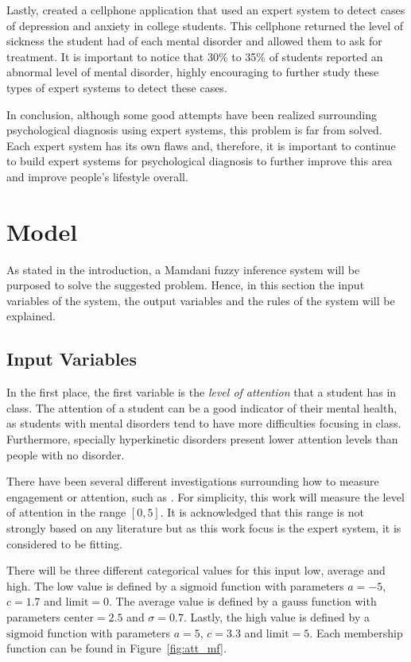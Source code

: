 \documentclass[conference]{IEEEtran}
\theoremstyle{definition}
\theoremstyle{remark}
\theoremstyle{remark}
\begin{document}
Lastly, \textcite{jabeen2018} created a cellphone application that used an
expert system to detect cases of depression and anxiety in college students.
This cellphone returned the level of sickness the student had of each mental
disorder and allowed them to ask for treatment. It is important to notice that
30\% to 35\% of students reported an abnormal level of mental disorder, highly
encouraging to further study these types of expert systems to detect these
cases.

In conclusion, although some good attempts have been realized surrounding
psychological diagnosis using expert systems, this problem is far from solved.
Each expert system has its own flaws and, therefore, it is important to continue
to build expert systems for psychological diagnosis to further improve this area
and improve people's lifestyle overall.

\section{Model}
As stated in the introduction, a Mamdani fuzzy inference system will be purposed
to solve the suggested problem. Hence, in this section the input variables of
the system, the output variables and the rules of the system will be explained.

\subsection{Input Variables}
In the first place, the first variable is the \textit{level of attention} that a
student has in class. The attention of a student can be a good indicator of
their mental health, as students with mental disorders tend to have more
difficulties focusing in class. Furthermore, specially hyperkinetic disorders
present lower attention levels than people with no disorder.

There have been several different investigations surrounding how to measure
engagement or attention, such as \textcite{wang2014}. For simplicity, this work
will measure the level of attention in the range $[0, 5]$. It is acknowledged
that this range is not strongly based on any literature but as this work focus
is the expert system, it is considered to be fitting.

There will be three different categorical values for this input low, average and
high. The low value is defined by a $\mathrm{sigmoid}$ function with parameters
$a=-5$, $c=1.7$ and $\mathrm{limit} = 0$. The average value is defined by a
$\mathrm{gauss}$ function with parameters $\mathrm{center}=2.5$ and
$\sigma = 0.7$. Lastly, the high value is defined by a $\mathrm{sigmoid}$
function with parameters $a = 5$, $c=3.3$ and $\mathrm{limit} = 5$. Each
membership function can be found in Figure~\ref{fig:att_mf}.
\end{document}
